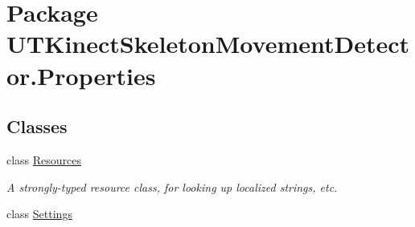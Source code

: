 \hypertarget{namespaceUTKinectSkeletonMovementDetector_1_1Properties}{\section{Package U\-T\-Kinect\-Skeleton\-Movement\-Detector.\-Properties}
\label{namespaceUTKinectSkeletonMovementDetector_1_1Properties}
}
\subsection*{Classes}
\begin{DoxyCompactItemize}
\item 
class \hyperlink{classUTKinectSkeletonMovementDetector_1_1Properties_1_1Resources}{Resources}
\begin{DoxyCompactList}\small\item\em A strongly-\/typed resource class, for looking up localized strings, etc. \end{DoxyCompactList}\item 
class \hyperlink{classUTKinectSkeletonMovementDetector_1_1Properties_1_1Settings}{Settings}
\end{DoxyCompactItemize}
